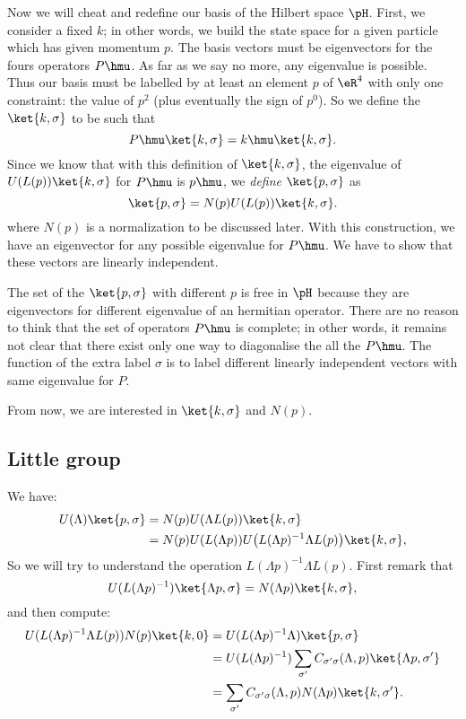 Now we will cheat and redefine our basis of the Hilbert space $\pH$. First, we consider a fixed $k$; in other words, we build the state space for a given particle which has given momentum $p$.  The basis vectors must be eigenvectors for the fours operators $P\hmu$. As far as we say no more, any eigenvalue is possible. Thus our basis must be labelled by at least an element $p$ of $\eR^4$ with only one constraint: the value of $p^2$ (plus eventually the sign of $p^0$). So we define the $\ket{k,\sigma}$ to be such that
\[
   P\hmu\ket{k,\sigma}=k\hmu\ket{k,\sigma}.
\]
Since we know that with this definition of $\ket{k,\sigma}$, the eigenvalue of $U(L(p))\ket{k,\sigma}$ for $P\hmu$ is $p\hmu$, we \emph{define} $\ket{p,\sigma}$ as
\begin{equation}
  \ket{p,\sigma}=N(p)U(L(p))\ket{k,\sigma}.
\end{equation}
where $N(p)$ is a normalization to be discussed later. With this construction, we have an eigenvector for any possible eigenvalue for $P\hmu$. We have to show that these vectors are linearly independent.

The set of the $\ket{p,\sigma}$ with different $p$ is free in $\pH$ because they are eigenvectors for different eigenvalue of an hermitian operator. There are no reason to think that the set of operators $P\hmu$ is complete; in other words, it remains not clear that there exist only one way to diagonalise the all the $P\hmu$. The function of the extra label $\sigma$ is to label different linearly independent vectors with same eigenvalue for $P$.

From now, we are interested in $\ket{k,\sigma}$ and $N(p)$.

\subsection{Little group}

We have:
\begin{equation}
\begin{split}
  U(\Lambda)\ket{p,\sigma}&=N(p)U(\Lambda L(p))\ket{k,\sigma}\\
                          &=N(p)U(L(\Lambda p))U\big(  L(\Lambda p)^{-1}\Lambda L(p) \big)\ket{k,\sigma},
\end{split}
\end{equation}
So we will try to understand the operation $L(\Lambda p)^{-1}\Lambda L(p)$. First remark that
\[
   U(L(\Lambda p)^{-1})\ket{\Lambda p,\sigma}=N(\Lambda p)\ket{k,\sigma},
\]
and then compute:
\begin{equation}
\begin{split}
  U(L(\Lambda p)^{-1}\Lambda L(p) )N(p)\ket{k,0}&=U(L(\Lambda p)^{-1}\Lambda)\ket{p,\sigma}\\
                                               &=U(L(\Lambda p)^{-1})\sum_{\sigma'}
					         C_{\sigma'\sigma}(\Lambda,p)\ket{\Lambda p,\sigma'}\\
					       &=\sum_{\sigma'}C_{\sigma'\sigma}(\Lambda,p)
					         N(\Lambda p)\ket{k,\sigma'}.
\end{split}
\end{equation}

